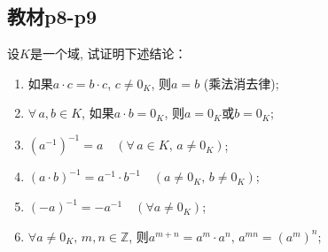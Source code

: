 \subsection{教材p8-p9}

\begin{problem}\label{ex:1.1.1}
    设$K$是一个域, 试证明下述结论： 
    
    \begin{enumerate}[(1)]
        \item 如果$a \cdot c = b \cdot c$, $c \neq 0_K$, 则$a = b$ (乘法消去律);
        \item $\forall \, a, b\in K$, 如果$a \cdot b = 0_K$, 则$a = 0_K$或$b = 0_K$;
        \item $(a^{-1})^{-1} = a \quad (\forall \, a \in K ,\, a \neq 0_K)$;
        \item $(a \cdot b)^{-1} = a^{-1} \cdot b^{-1} \quad (a \neq 0_K ,\, b \neq 0_K)$;
        \item $(-a)^{-1} = -a^{-1} \quad (\forall a \neq 0_K)$;
        \item $\forall a \neq 0_K ,\, m, n \in \mathbb{Z}$, 则$a^{m + n} = a^m \cdot a^n ,\, a^{mn} = (a^m)^n$;
    \end{enumerate}
\end{problem}

